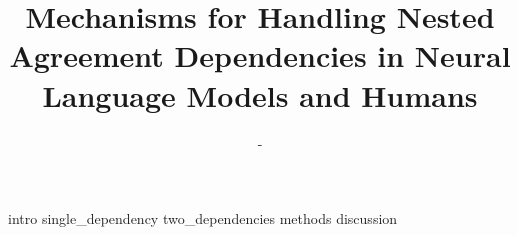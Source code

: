 \documentclass[a4paper,doc,natbib, floatsintext, hidelinks]{apa7}
\title{Mechanisms for Handling Nested Agreement Dependencies in Neural Language Models and Humans}
\author{-}
\affiliation{-}
\begin{document}
\maketitle
{intro}
{single_dependency}
{two_dependencies}
{methods}
{discussion}




\end{document}

